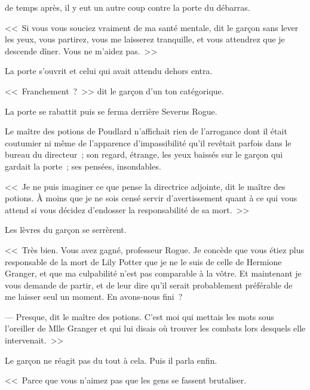 
 de temps après, il y eut un autre coup contre la porte du débarras.

\hplettrineextrapara
<<~Si vous vous souciez vraiment de ma santé mentale, dit le garçon sans lever les yeux, vous partirez, vous me laisserez tranquille, et vous attendrez que je descende dîner. Vous ne m'aidez pas.~>>

La porte s'ouvrit et celui qui avait attendu dehors entra.

<<~Franchement~?~>> dit le garçon d'un ton catégorique.

La porte se rabattit puis se ferma derrière Severus Rogue.

Le maître des potions de Poudlard n'affichait rien de l'arrogance dont il était coutumier ni même de l'apparence d'impassibilité qu'il revêtait parfois dans le bureau du directeur~; son regard, étrange, les yeux baissés sur le garçon qui gardait la porte~; ses pensées, insondables.

<<~Je ne puis imaginer ce que pense la directrice adjointe, dit le maître des potions. À moins que je ne sois censé servir d'avertissement quant à ce qui vous attend si vous décidez d'endosser la responsabilité de sa mort.~>>

Les lèvres du garçon se serrèrent.

<<~Très bien. Vous avez gagné, professeur Rogue. Je concède que vous étiez plus responsable de la mort de Lily Potter que je ne le suis de celle de Hermione Granger, et que ma culpabilité n'est pas comparable à la vôtre. Et maintenant je vous demande de partir, et de leur dire qu'il serait probablement préférable de me laisser seul un moment. En avons-nous fini~?

--- Presque, dit le maître des potions. C'est moi qui mettais les mots sous l'oreiller de Mlle Granger et qui lui disais où trouver les combats lors desquels elle intervenait.~>>

Le garçon ne réagit pas du tout à cela. Puis il parla enfin.

<<~Parce que vous n'aimez pas que les gens se fassent brutaliser.

